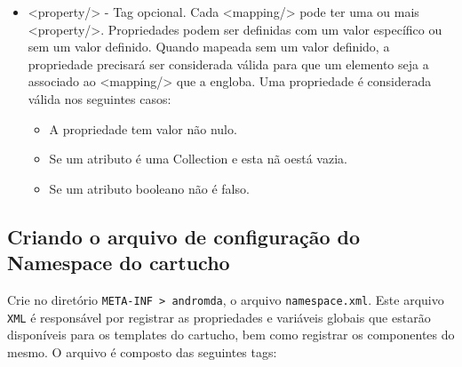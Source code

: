 \begin{itemize}
  \item <property/> - Tag opcional. Cada <mapping/> pode ter uma ou mais
  <property/>. Propriedades podem ser definidas com um valor específico ou sem
  um valor definido. Quando mapeada sem um valor definido, a propriedade
  precisará ser considerada válida para que um elemento seja a associado ao
  <mapping/> que a engloba. Uma propriedade é considerada válida nos seguintes
  casos:
  
  \begin{itemize}
    \item A propriedade tem valor não nulo.
    \item Se um atributo é uma Collection e esta nã oestá vazia.
    \item Se um atributo booleano não é falso.
  \end{itemize}
  
\end{itemize}

\subsection{Criando o arquivo de configuração do Namespace do cartucho}
Crie no diretório \texttt{META-INF > andromda}, o arquivo
\texttt{namespace.xml}. Este arquivo \texttt{XML} é responsável por registrar as
propriedades e variáveis globais que estarão disponíveis para os templates do
cartucho, bem como registrar os componentes do mesmo. O arquivo é composto das
seguintes tags:

